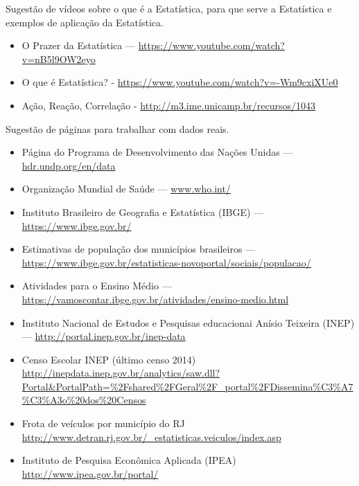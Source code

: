 {Sugestão de vídeos sobre o que é a Estatística, para que serve a Estatística e exemplos de aplicação da Estatística.
\begin{itemize}
\item {} 
O Prazer da Estatística --- \url{https://www.youtube.com/watch?v=nB5l9OW2eyo}

\item {} 
O que é Estatística? - \url{https://www.youtube.com/watch?v=-Wm9cxiXUe0}

\item {} 
Ação, Reação, Correlação - \url{http://m3.ime.unicamp.br/recursos/1043}

\end{itemize}

Sugestão de páginas para trabalhar com dados reais.
\begin{itemize}
\item {} 
Página do Programa de Desenvolvimento das Nações Unidas --- \url{hdr.undp.org/en/data}

\item {} 
Organização Mundial de Saúde --- \url{www.who.int/}

\item {} 
Instituto Brasileiro de Geografia e Estatística (IBGE) --- \url{https://www.ibge.gov.br/}

\item {} 
Estimativas de população dos municípios brasileiros --- \url{https://www.ibge.gov.br/estatisticas-novoportal/sociais/populacao/}

\item {} 
Atividades para o Ensino Médio --- \url{https://vamoscontar.ibge.gov.br/atividades/ensino-medio.html}


\item {} 
Instituto Nacional de Estudos e Pesquisas educacionai Anísio Teixeira (INEP) --- \url{http://portal.inep.gov.br/inep-data}


\item {} 
Censo Escolar INEP (último censo 2014) \textendash{} \url{http://inepdata.inep.gov.br/analytics/saw.dll?Portal\&PortalPath=\%2Fshared\%2FGeral\%2F\_portal\%2FDissemina\%C3\%A7\%C3\%A3o\%20dos\%20Censos}

\item {} 
Frota de veículos por município do RJ \textendash{} \url{http://www.detran.rj.gov.br/\_estatisticas.veiculos/index.asp}

\item {} 
Instituto de Pesquisa Econômica Aplicada (IPEA) \textendash{} \url{http://www.ipea.gov.br/portal/}


\end{itemize}}

